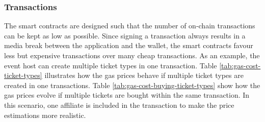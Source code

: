 \subsubsection{Transactions}
The smart contracts are designed such that the number of on-chain transactions can be kept as low as possible. Since signing a transaction always results in a media break between the application and the wallet, the smart contracts favour less but expensive transactions over many cheap transactions. As an example, the event host can create multiple ticket types in one transaction. Table \ref{tab:gas-cost-ticket-types} illustrates how the gas prices behave if multiple ticket types are created in one transactions. Table \ref{tab:gas-cost-buying-ticket-types} show how the gas prices evolve if multiple tickets are bought within the same transaction. In this scenario, one affiliate is included in the transaction to make the price estimations more realistic.

